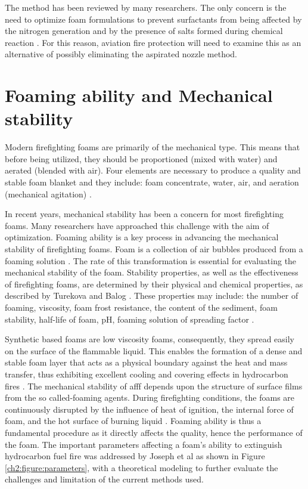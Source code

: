 The method has been reviewed by many researchers.  The only concern is the need to optimize foam formulations to prevent surfactants from being affected by the nitrogen generation and by the presence of salts formed during chemical reaction \cite{laundess2012suppression}.  For this reason, aviation fire protection will need to examine this as an alternative of possibly eliminating the aspirated nozzle method.

\section{Foaming ability and Mechanical stability}
Modern firefighting foams are primarily of the mechanical type. This means that before being utilized, they should be proportioned (mixed with water) and aerated (blended with air). Four elements are necessary to produce a quality and stable foam blanket and they include: foam concentrate, water, air, and aeration (mechanical agitation) \cite{oguike2013study}.

In recent years, mechanical stability has been a concern for most firefighting foams. Many researchers have approached this challenge with the aim of optimization. Foaming ability is a key process in advancing the mechanical stability of firefighting foams. Foam is a collection of air bubbles produced from a foaming solution \cite{oguike2013study}. The rate of this transformation is essential for evaluating the mechanical stability of the foam. Stability properties, as well as the effectiveness of firefighting foams, are determined by their physical and chemical properties, as described by Turekova and Balog \cite{turekova2011environmental}. These properties may include: the number of foaming, viscosity, foam frost resistance, the content of the sediment, foam stability, half-life of foam, pH, foaming solution of spreading factor \cite{turekova2011environmental}.

Synthetic based foams are low viscosity foams, consequently, they spread easily on the surface of the flammable liquid. This enables the formation of a dense and stable foam layer that acts as a physical boundary against the heat and mass transfer, thus exhibiting excellent cooling and covering effects in hydrocarbon fires \cite{xu2020fire}. The mechanical stability of \acrshort{afff} depends upon the structure of surface films from the so called-foaming agents. During firefighting conditions, the foams are continuously disrupted by the influence of heat of ignition, the internal force of foam, and the hot surface of burning liquid \cite{turekova2011environmental}. Foaming ability is thus a fundamental procedure as it directly affects the quality, hence the performance of the foam. The important parameters affecting a foam's ability to extinguish hydrocarbon fuel fire was addressed by Joseph et al \cite{scheffey1995evaluating} as shown in Figure \ref{ch2:figure:parameters}, with a theoretical modeling to further evaluate the challenges and limitation of the current methods used. 

